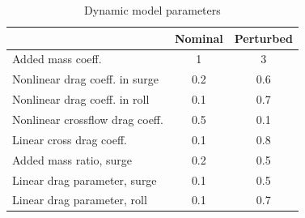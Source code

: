 \documentclass[../main.tex]{subfiles}
\begin{document}
\begin{table}[b]
    \caption{Dynamic model parameters}
    \label{tab:param}
\begin{center}
\begin{tabular}{|l|c|c|}
\hline
    & Nominal & Perturbed \\
    \hline
    Added mass coeff. & 1 & 3 \rule{0pt}{2.6ex}\\
    Nonlinear drag coeff. in surge & 0.2& 0.6\\
    Nonlinear drag coeff. in roll &0.1& 0.7 \\
    Nonlinear crossflow drag coeff. &0.5&0.1  \\
    Linear cross drag coeff. &0.1&0.8  \\
    Added mass ratio, surge &0.2& 0.5 \\
    Linear drag parameter, surge &0.1&0.5  \\
    Linear drag parameter, roll &0.1&0.7  \\
    \hline
\end{tabular}
\end{center}
\end{table}
\end{document}

